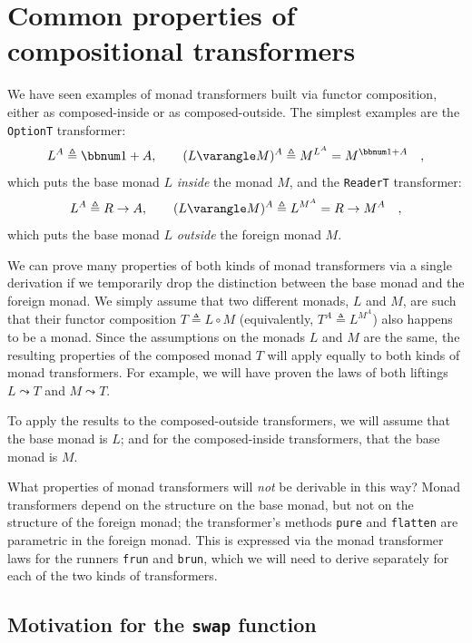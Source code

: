 \section{Common properties of compositional transformers \label{sec:Monad-transformers-that-use-composition}}

We have seen examples of monad transformers built via functor composition,
either as composed-inside or as composed-outside. The simplest examples
are the \lstinline!OptionT! transformer:
\[
L^{A}\triangleq\bbnum 1+A,\quad\quad(L\varangle M)^{A}\triangleq M^{L^{A}}=M^{\bbnum 1+A}\quad,
\]
which puts the base monad $L$ \emph{inside} the monad $M$, and the
\lstinline!ReaderT! transformer:
\[
L^{A}\triangleq R\rightarrow A,\quad\quad(L\varangle M)^{A}\triangleq L^{M^{A}}=R\rightarrow M^{A}\quad,
\]
which puts the base monad $L$ \emph{outside} the foreign monad $M$. 

We can prove many properties of both kinds of monad transformers via
a single derivation if we temporarily drop the distinction between
the base monad and the foreign monad. We simply assume that two different
monads, $L$ and $M$, are such that their functor composition $T\triangleq L\circ M$
(equivalently, $T^{A}\triangleq L^{M^{A}}$) also happens to be a
monad. Since the assumptions on the monads $L$ and $M$ are the same,
the resulting properties of the composed monad $T$ will apply equally
to both kinds of monad transformers. For example, we will have proven
the laws of both liftings $L\leadsto T$ and $M\leadsto T$.

To apply the results to the composed-outside transformers, we will
assume that the base monad is $L$; and for the composed-inside transformers,
that the base monad is $M$. 

What properties of monad transformers will \emph{not} be derivable
in this way? Monad transformers depend on the structure on the base
monad, but not on the structure of the foreign monad; the transformer\textsf{'}s
methods \lstinline!pure! and \lstinline!flatten! are parametric
in the foreign monad. This is expressed via the monad transformer
laws for the runners \lstinline!frun! and \lstinline!brun!, which
we will need to derive separately for each of the two kinds of transformers.

\subsection{Motivation for the \texttt{swap} function\label{subsec:Motivation-for-the-swap-function}}

